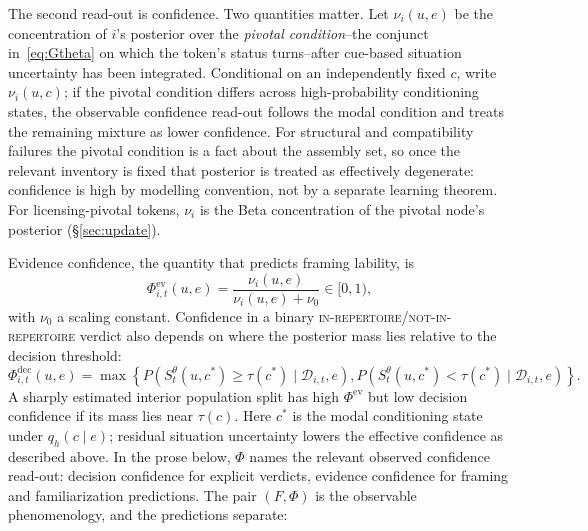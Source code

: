 The second read-out is confidence. Two quantities matter. Let $\nu_i(u,e)$ be
the concentration of $i$'s posterior over the \emph{pivotal condition}--the
conjunct in~\eqref{eq:Gtheta} on which the token's status turns--after cue-based
situation uncertainty has been integrated. Conditional on an independently fixed
$c$, write $\nu_i(u,c)$; if the pivotal condition differs across
high-probability conditioning states, the observable confidence read-out follows
the modal condition and treats the remaining mixture as lower confidence. For
structural and compatibility failures the pivotal condition is a fact about the
assembly set, so once the relevant inventory is fixed that posterior is treated
as effectively degenerate: confidence is high by modelling convention, not by a
separate learning theorem. For licensing-pivotal tokens, $\nu_i$ is the Beta
concentration of the pivotal node's posterior (\S\ref{sec:update}).

Evidence confidence, the quantity that predicts framing lability, is
\begin{equation}
\Phi^{\mathrm{ev}}_{i,t}(u,e)=\frac{\nu_i(u,e)}{\nu_i(u,e)+\nu_0}
\in [0,1),
\end{equation}
\noindent with $\nu_0$ a scaling constant. Confidence in a binary
\textsc{in-repertoire}/\textsc{not-in-repertoire} verdict also depends on where
the posterior mass lies relative to the decision threshold:
\begin{equation}
\Phi^{\mathrm{dec}}_{i,t}(u,e)=
\max\!\left\{
P\!\left(S_t^{\theta}(u,c^\ast)\ge\tau(c^\ast)\mid\mathcal{D}_{i,t},e\right),
P\!\left(S_t^{\theta}(u,c^\ast)<\tau(c^\ast)\mid\mathcal{D}_{i,t},e\right)
\right\}.
\label{eq:phi-dec}
\end{equation}
A sharply estimated interior population split has high
$\Phi^{\mathrm{ev}}$ but low decision confidence if its mass lies near
$\tau(c)$. Here $c^\ast$ is the modal conditioning state under $q_h(c\mid e)$;
residual situation uncertainty lowers the effective confidence as described
above. In the prose below, $\Phi$ names the relevant observed confidence
read-out: decision confidence for explicit verdicts, evidence confidence for
framing and familiarization predictions. The pair $(F,\Phi)$ is the observable
phenomenology, and the predictions separate:

